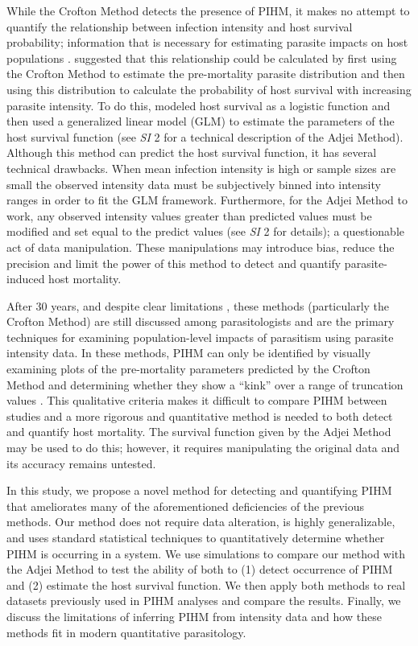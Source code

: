 \documentclass[12pt, a4paper]{article}
\begin{document}
While the Crofton Method detects the presence of PIHM, it makes no attempt to
quantify the relationship between infection intensity and host survival
probability; information that is necessary for estimating parasite impacts on host populations \citep{AndersonandMay1978,Tompkins2002}. \cite{Adjei1986}
suggested that this relationship could be calculated by first using the Crofton
Method to estimate the pre-mortality parasite distribution and then using this
distribution to calculate the probability of host survival with increasing
parasite intensity. To do this, \cite{Adjei1986} modeled host survival as a
logistic function and then used a generalized linear model (GLM) to estimate
the parameters of the host survival function (see \emph{SI} 2 for a technical
description of the Adjei Method).  Although this method can predict the host survival function, it has several technical drawbacks. When mean infection intensity is high or sample sizes
are small the observed intensity data must be subjectively binned into
intensity ranges in order to fit the GLM framework. Furthermore, for the Adjei
Method to work, any observed intensity values greater than predicted values
must be modified and set equal to the predict values (see \emph{SI} 2 for
details); a questionable act of data manipulation. These manipulations may introduce bias, reduce the precision and
limit the power of this method to detect and quantify parasite-induced host
mortality.

After 30 years, and despite clear limitations \citep{McCallum2000a}, these
methods (particularly the Crofton Method) are still discussed among
parasitologists and are the primary techniques for examining population-level
impacts of parasitism using parasite intensity data. In these methods, PIHM can only be identified by visually examining plots of the pre-mortality parameters predicted by the Crofton Method and determining whether they show a ``kink'' over a range of truncation values \citep[Figure \ref{fig:crofton}B;][]{Lester1984,Ferguson2011}. This qualitative criteria makes it difficult to compare PIHM between studies and a more rigorous and quantitative method is needed to both detect and quantify host mortality. The survival function given by the Adjei
Method may be used to do this; however, it requires manipulating the
original data and its accuracy remains untested.

In this study, we propose a novel method for detecting and quantifying PIHM that ameliorates many of the aforementioned deficiencies of the previous methods. Our method does not require data alteration, is highly generalizable, and uses standard statistical techniques to quantitatively determine whether PIHM is occurring in a system.  We
use simulations to compare our method with the Adjei
Method to test the ability of both to (1) detect occurrence of PIHM and (2) estimate the host survival function.  We then
apply both methods to real datasets previously used in PIHM analyses and
compare the results. Finally, we discuss the limitations of inferring PIHM
from intensity data and how these methods fit in modern quantitative parasitology.
\end{document}

